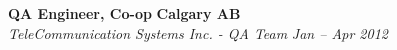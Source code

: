    \textbf{QA Engineer, Co-op}
    \hfill
    \textbf{Calgary AB}\\
    \textit{TeleCommunication Systems Inc. - QA Team}
    \hfill
    \textit{Jan -- Apr 2012}
    \vspace{\interlist}
